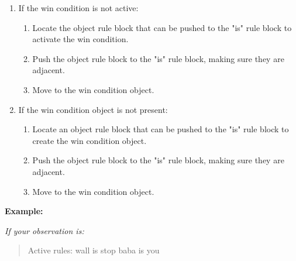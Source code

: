 \begin{GreenBox}
\begin{enumerate}
		\item If the win condition is not active:
			\begin{enumerate}
				\item Locate the object rule block that can be pushed to the "is" rule block
					to activate the win condition.

				\item Push the object rule block to the "is" rule block, making sure
					they are adjacent.

				\item Move to the win condition object.
			\end{enumerate}

		\item If the win condition object is not present:
			\begin{enumerate}
				\item Locate an object rule block that can be pushed to the "is" rule block
					to create the win condition object.

				\item Push the object rule block to the "is" rule block, making sure
					they are adjacent.

				\item Move to the win condition object.
			\end{enumerate}
	\end{enumerate}

	\textbf{Example:}

	\textit{If your observation is:}
	\begin{quote}
		Active rules: wall is stop baba is you


\end{quote}
\end{GreenBox}
